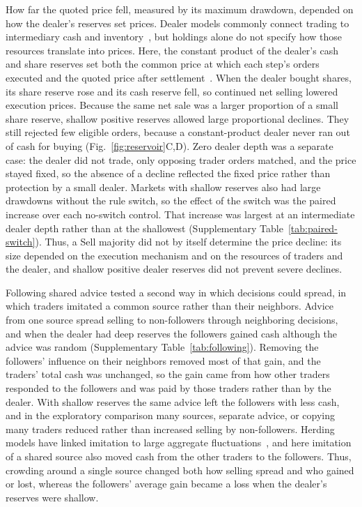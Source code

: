 How far the quoted price fell, measured by its maximum drawdown,
depended on how the dealer's reserves set prices. Dealer models commonly
connect trading to intermediary cash and
inventory~\cite{garman1976market,stoll1978supply,ho1981optimal,braunmunzinger2018agent},
but holdings alone do not specify how those resources translate into
prices. Here, the constant product of the dealer's cash and share
reserves set both the common price at which each step's orders executed
and the quoted price after settlement~\cite{angeris2022constant}. When
the dealer bought shares, its share reserve rose and its cash reserve
fell, so continued net selling lowered execution prices. Because the same
net sale was a larger proportion of a small share reserve, shallow
positive reserves allowed large proportional declines. They still
rejected few eligible orders, because a constant-product dealer never ran
out of cash for buying (Fig.~\ref{fig:reservoir}C,D). Zero dealer depth was
a separate case: the dealer did not trade, only opposing trader orders
matched, and the price stayed fixed, so the absence of a decline
reflected the fixed price rather than protection by a small dealer.
Markets with shallow reserves also had large drawdowns without the rule
switch, so the effect of the switch was the paired increase over each
no-switch control. That increase was largest at an intermediate dealer
depth rather than at the shallowest (Supplementary
Table~\ref{tab:paired-switch}). Thus, a Sell majority did not by itself
determine the price decline: its size depended on the execution
mechanism and on the resources of traders and the dealer, and shallow
positive dealer reserves did not prevent severe declines.

Following shared advice tested a second way in which decisions could
spread, in which traders imitated a common source rather than their
neighbors. Advice from one source spread selling to non-followers through
neighboring decisions, and when the dealer had deep reserves the
followers gained cash although the advice was random (Supplementary
Table~\ref{tab:following}). Removing the followers' influence on their
neighbors removed most of that gain, and the traders' total cash was
unchanged, so the gain came from how other traders responded to the
followers and was paid by those traders rather than by the dealer. With
shallow reserves the same advice left the followers with less cash, and
in the exploratory comparison many sources, separate advice, or copying
many traders reduced rather than increased selling by non-followers.
Herding models have linked imitation to large aggregate
fluctuations~\cite{cont2000herd,chen2015herding}, and here imitation of a
shared source also moved cash from the other traders to the followers.
Thus, crowding around a single source changed both how selling spread
and who gained or lost, whereas the followers' average gain became a
loss when the dealer's reserves were shallow.

